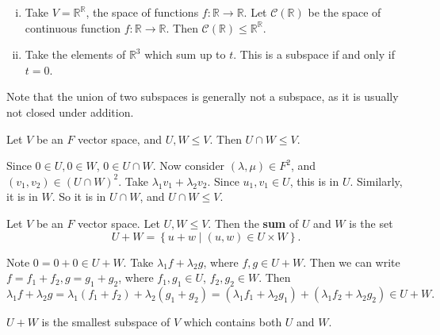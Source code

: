 \documentclass[12pt]{article}
\begin{document}
\begin{exbox}
	\begin{enumerate}[(i)]
		\item Take $V = \mathbb{R}^{\mathbb{R}}$, the space of functions $f : \mathbb{R} \to \mathbb{R}$. Let $\mathcal{C}(\mathbb{R})$ be the space of continuous function $f : \mathbb{R} \to \mathbb{R}$. Then $\mathcal{C}(\mathbb{R}) \leq \mathbb{R}^{\mathbb{R}}$.
		\item Take the elements of $\mathbb{R}^3$ which sum up to $t$. This is a subspace if and only if $t = 0$.
	\end{enumerate}	
\end{exbox}

Note that the union of two subspaces is generally not a subspace, as it is usually not closed under addition.

\begin{proposition}
	Let $V$ be an $F$ vector space, and $U, W \leq V$. Then $U \cap W \leq V$.
\end{proposition}

\begin{proofbox}
	Since $0 \in U, 0 \in W$, $0 \in U \cap W$. Now consider $(\lambda, \mu) \in F^2$, and $(v_1, v_2) \in (U \cap W)^2$. Take $\lambda_1 v_1 + \lambda_2 v_2$. Since $u_1,v_1 \in U$, this is in $U$. Similarly, it is in $W$. So it is in $U \cap W$, and $U \cap W \leq V$.
\end{proofbox}

\begin{definition}
	Let $V$ be an $F$ vector space. Let $U, W \leq V$. Then the \textbf{sum} of $U$ and $W$ is the set
	\[
		U + W = \left\{ u + w \mid (u, w) \in U \times W \right\}
	.\]
\end{definition}

\begin{proofbox}
	Note $0 = 0 + 0 \in U + W$. Take $\lambda_1 f + \lambda_2 g$, where $f, g \in U + W$. Then we can write $f = f_1 + f_2, g = g_1 + g_2$, where $f_1, g_1 \in U$, $f_2, g_2 \in W$. Then 
\[
	\lambda_1 f + \lambda_2 g = \lambda_1 (f_1 + f_2) + \lambda_2(g_1 + g_2) = (\lambda_1 f_1 + \lambda_2 g_1) + (\lambda_1 f_2 + \lambda_2 g_2) \in U + W
.\]
\end{proofbox}

\begin{remark}
	$U + W$ is the smallest subspace of $V$ which contains both $U$ and $W$.
\end{remark}
\end{document}
